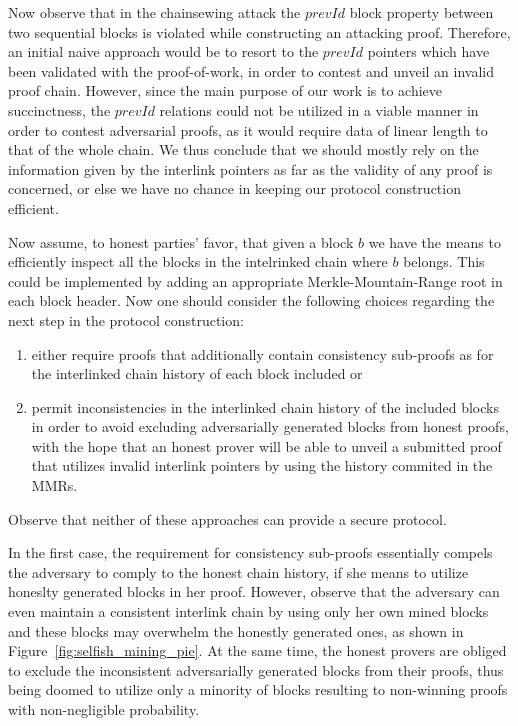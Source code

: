 Now observe that in the chainsewing attack the $prevId$ block property between two sequential blocks is violated while constructing an attacking proof. Therefore, an initial naive approach would be to resort to the $prevId$ pointers which have been validated with the proof-of-work, in order to contest and unveil an invalid proof chain. However, since the main purpose of our work is to achieve
succinctness, the $prevId$ relations could not be utilized in a viable manner
in order to contest adversarial proofs, as it would require data of linear length
to that of the whole chain.  We thus conclude that we should mostly rely on the
information given by the interlink pointers as far as the validity of any proof
is concerned, or else we have no chance in keeping our protocol construction efficient.

Now assume, to honest parties' favor, that given a block $b$ we have the means to efficiently inspect
all the blocks in the intelrinked chain where $b$ belongs. This could be implemented by adding an appropriate Merkle-Mountain-Range root in each block header. Now one should consider the following choices regarding the next step in the protocol construction: 
\begin{enumerate}
	\item either require proofs that additionally contain consistency sub-proofs as for the interlinked chain history of each block included or
	\item permit inconsistencies in the interlinked chain history of the included blocks in order to avoid excluding adversarially generated blocks from honest proofs, with the hope that an honest prover will be able to unveil a submitted proof that utilizes invalid interlink pointers by using the history commited in the MMRs. 
\end{enumerate}
Observe that neither of these approaches can provide a secure protocol. 

In the first case, the requirement for consistency sub-proofs essentially compels the adversary to comply to the honest chain history, if she means to utilize honeslty generated blocks in her proof. However, observe that the adversary can even maintain a consistent interlink chain 
by using only her own mined blocks and these blocks may overwhelm
the honestly generated ones, as shown in Figure~\ref{fig:selfish_mining_pie}. At the same time, the honest provers are obliged to exclude the inconsistent adversarially generated blocks from their proofs, thus being doomed to utilize only a minority of blocks resulting to non-winning proofs with non-negligible probability. 

